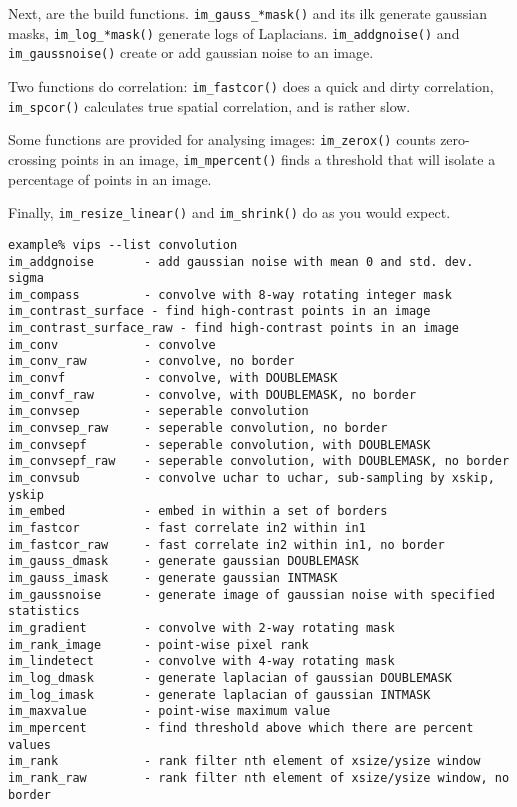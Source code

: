 Next, are the build functions. \verb+im_gauss_*mask()+ and its ilk
generate gaussian masks, \verb+im_log_*mask()+ generate logs of Laplacians.
\verb+im_addgnoise()+ and \verb+im_gaussnoise()+ create or add gaussian
noise to an image.

Two functions do correlation: \verb+im_fastcor()+ does a quick and dirty
correlation, \verb+im_spcor()+ calculates true spatial correlation, and is
rather slow.

Some functions are provided for analysing images: \verb+im_zerox()+ counts
zero-crossing points in an image, \verb+im_mpercent()+ finds a threshold
that will isolate a percentage of points in an image.

Finally, \verb+im_resize_linear()+ and \verb+im_shrink()+ do as you would
expect.

\begin{fig2}
\begin{verbatim}
example% vips --list convolution
im_addgnoise       - add gaussian noise with mean 0 and std. dev. sigma
im_compass         - convolve with 8-way rotating integer mask
im_contrast_surface - find high-contrast points in an image
im_contrast_surface_raw - find high-contrast points in an image
im_conv            - convolve
im_conv_raw        - convolve, no border
im_convf           - convolve, with DOUBLEMASK
im_convf_raw       - convolve, with DOUBLEMASK, no border
im_convsep         - seperable convolution
im_convsep_raw     - seperable convolution, no border
im_convsepf        - seperable convolution, with DOUBLEMASK
im_convsepf_raw    - seperable convolution, with DOUBLEMASK, no border
im_convsub         - convolve uchar to uchar, sub-sampling by xskip, yskip
im_embed           - embed in within a set of borders
im_fastcor         - fast correlate in2 within in1
im_fastcor_raw     - fast correlate in2 within in1, no border
im_gauss_dmask     - generate gaussian DOUBLEMASK
im_gauss_imask     - generate gaussian INTMASK
im_gaussnoise      - generate image of gaussian noise with specified statistics
im_gradient        - convolve with 2-way rotating mask
im_rank_image      - point-wise pixel rank
im_lindetect       - convolve with 4-way rotating mask
im_log_dmask       - generate laplacian of gaussian DOUBLEMASK
im_log_imask       - generate laplacian of gaussian INTMASK
im_maxvalue        - point-wise maximum value
im_mpercent        - find threshold above which there are percent values
im_rank            - rank filter nth element of xsize/ysize window
im_rank_raw        - rank filter nth element of xsize/ysize window, no border

\end{verbatim}
\end{fig2}
